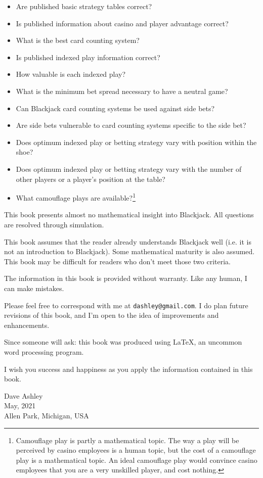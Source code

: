 \begin{itemize}
   \item Are published basic strategy tables correct?
   \item Is published information about casino and player advantage correct?
   \item What is the best card counting system?
   \item Is published indexed play information correct?
   \item How valuable is each indexed play?
   \item What is the minimum bet spread necessary to have a neutral game?
   \item Can Blackjack card counting systems be used against side bets?
   \item Are side bets vulnerable to card counting systems specific
         to the side bet?
   \item Does optimum indexed play or betting strategy vary with position
         within the shoe?
   \item Does optimum indexed play or betting strategy vary with the
         number of other players or a player's position at the table?
   \item What camouflage plays are available?\footnote{Camouflage play is partly
         a mathematical topic.  The way a play will be
         perceived by casino employees is a human topic, but the cost of a 
         camouflage play is a mathematical topic.  An ideal camouflage play would
         convince casino employees that you are a very unskilled player,
         and cost nothing.}
\end{itemize}

This book presents almost no mathematical insight into Blackjack.  All questions are
resolved through simulation.

This book assumes that the reader already understands Blackjack well (i.e. it is
not an introduction to Blackjack).  Some mathematical maturity is also assumed.
This book may be difficult for readers who don't meet those two criteria.

The information in this book is provided without warranty.  Like any human, I can make
mistakes.

Please feel free to correspond with me at \texttt{dashley@gmail.com}.  I do plan
future revisions of this book, and I'm open to the idea of improvements and enhancements.

Since someone will ask: this book was produced using \LaTeX{}, an uncommon word
processing program.

I wish you success and happiness as you apply the information contained in this book.

\vspace*{0.15in}

\noindent{}\hspace*{2.25in}Dave Ashley\\
\noindent{}\hspace*{2.25in}May, 2021\\
\noindent{}\hspace*{2.25in}Allen Park, Michigan, USA
